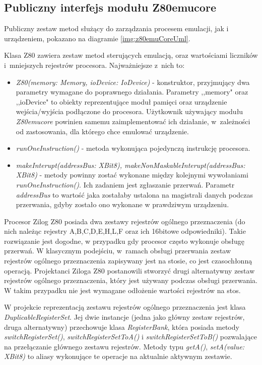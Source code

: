 	\subsection{Publiczny interfejs modułu Z80emu{\dywiz}core}
	Publiczny zestaw metod służący do zarządzania procesem emulacji, jak i urządzeniem, pokazano na diagramie \ref{img:z80emuCoreUml}.
	
	Klasa Z80 zawiera zestaw metod sterujących emulacją, oraz wartościami liczników i~mniejszych rejestrów procesora. Najważniejsze z~nich to:
	\begin{itemize}  
		\item \emph{Z80(memory: Memory, ioDevice: IoDevice)} - konstruktor, przyjmujący dwa parametry wymagane do poprawnego działania. Parametry ,,memory" oraz ,,ioDevice" to obiekty reprezentujące moduł pamięci oraz urządzenie wejścia/wyjścia podłączone do procesora. Użytkownik używający modułu \emph{Z80emu{\dywiz}core} powinien samemu zaimplementować ich działanie, w~zależności od zastosowania, dla którego chce emulować urządzenie. 
		
		\item \emph{runOneInstruction()} - metoda wykonująca pojedynczą instrukcję procesora.
		
		\item \emph{makeInterupt(addressBus: XBit8), makeNonMaskableInterupt(addressBus: XBit8)} - metody powinny zostać wykonane między kolejnymi wywołaniami \emph{runOneInstruction()}. Ich zadaniem jest zgłaszanie przerwań. Parametr \emph{addressBus} to wartość jaka zostałaby ustalona na magistrali danych podczas przerwania, gdyby zostało ono wykonane w prawdziwym urządzeniu.
	\end{itemize}
	
	Procesor Zilog Z80 posiada dwa zestawy rejestrów ogólnego przeznaczenia (do nich należąc rejestry A,B,C,D,E,H,L,F oraz ich 16bitowe odpowiedniki). Takie rozwiązanie jest dogodne, w przypadku gdy procesor często wykonuje obsługę przerwań. W klasycznym podejściu, w~ramach obsługi przerwania zestaw rejestrów ogólnego przeznaczenia zapisywany jest na stosie, co jest czasochłonną operacją. Projektanci Ziloga Z80 postanowili stworzyć drugi alternatywny zestaw rejestrów ogólnego przeznaczenia, który jest używany podczas obsługi przerwania. W takim przypadku nie jest wymagane odłożenie wartości rejestrów na stos.
	
	W projekcie reprezentacją zestawu rejestrów ogólnego przeznaczenia jest klasa \emph{DuplicableRegisterSet}. Jej dwie instancje (jedna jako główny zestaw rejestrów, druga alternatywny) przechowuje klasa \emph{RegisterBank}, która posiada metody \emph{switchRegisterSet()}, \emph{switchRegisterSetToA()} i \emph{switchRegisterSetToB()} pozwalające na przełączanie głównego zestawu rejestrów. Metody typu \emph{getA()}, \emph{setA(value: XBit8)} to aliasy wykonujące te operacje na aktualnie aktywnym zestawie. 
	
